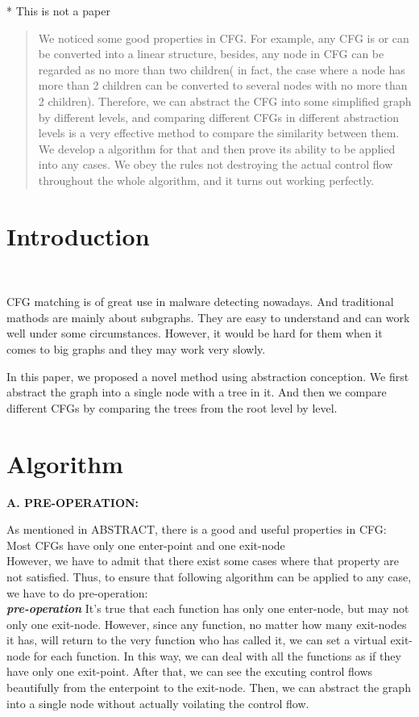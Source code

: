 \documentclass[12pt]{article}
\begin{document}
\maketitle
* This is not a paper
\begin{abstract}
We noticed some good properties in CFG. For example, any CFG is or can be converted into a linear structure, besides, any node in CFG can be regarded as no more than two children( in fact, the case where a node has more than 2 children can be converted to several nodes with no more than 2 children). Therefore, we can abstract the CFG into some simplified graph by different levels, and comparing different CFGs in different abstraction levels is a very effective method to compare the similarity between them. We develop a algorithm for that and then prove its ability to be applied into any cases. We obey the rules not destroying the actual control flow throughout the whole algorithm, and it turns out working perfectly.
\end{abstract}

\section{Introduction}\

CFG matching is of great use in malware detecting nowadays. And traditional mathods are mainly about subgraphs. They are easy to understand and can work well under some circumstances. However, it would be hard for them when it comes to big graphs and they may work very slowly.\

In this paper, we proposed a novel method using abstraction conception. We first abstract the graph into a single node with a tree in it. And then we compare different CFGs by comparing the trees from the root level by level. 
\section{Algorithm}
\textbf{A. PRE-OPERATION:}\

As mentioned in ABSTRACT, there is a good and useful properties in CFG: Most CFGs have only one enter-point and one exit-node\\

   	 However, we have to admit that there exist some cases where that property are not satisfied. Thus, to ensure that following algorithm can be applied to any case, we have to do pre-operation:\\

\textit{\textbf{pre-operation}} It's true that each function has only one enter-node, but may not only one exit-node. However, since any function, no matter how many exit-nodes it has, will return to the very function who has called it, we can set a virtual exit-node for each function. In this way, we can deal with all the functions as if they have only one exit-point. After that, we can see the excuting control flows beautifully from the enterpoint to the exit-node. Then, we can abstract the graph into a single node without actually voilating the control flow.\\
\end{document}
